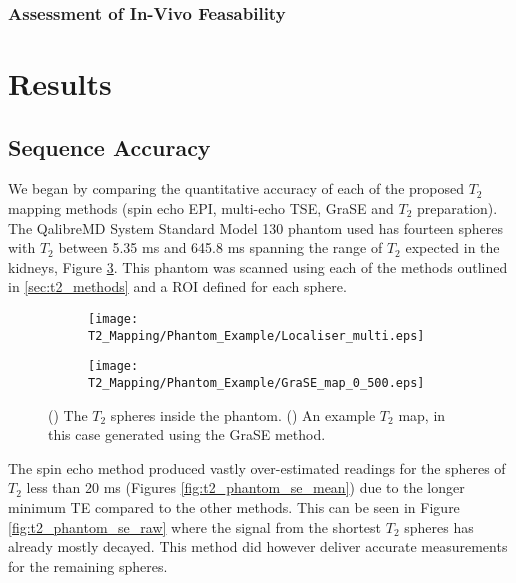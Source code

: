 \subsubsection{Assessment of In-Vivo Feasability}

\section{Results}

\subsection{Sequence Accuracy}

We began by comparing the quantitative accuracy of each of the proposed $T_2$ mapping methods (spin echo \ac{EPI}, multi-echo \ac{TSE}, \ac{GraSE} and $T_2$ preparation).  The QalibreMD System Standard Model 130 phantom used has fourteen spheres with $T_2$ between 5.35 ms and 645.8 ms spanning the range of $T_2$ expected in the kidneys, Figure \ref{fig:t2_phantom_eg}. This phantom was scanned using each of the methods outlined in \ref{sec:t2_methods} and a \ac{ROI} defined for each sphere. 

\begin{figure}[H]
	\centering
	\begin{subfigure}[c]{0.47\textwidth}
		\centering
		\texttt{[image: T2\_Mapping/Phantom\_Example/Localiser\_multi.eps]}
		\caption{}
		\label{fig:t2_phantom_loc}
	\end{subfigure}
	\hfill
	\begin{subfigure}[c]{0.47\textwidth}
		\centering
		\texttt{[image: T2\_Mapping/Phantom\_Example/GraSE\_map\_0\_500.eps]}
		\caption{}
		\label{fig:t2_phantom_map}
	\end{subfigure}
	\caption{() The $T_2$ spheres inside the phantom. () An example $T_2$ map, in this case generated using the \ac{GraSE} method.}
	\label{fig:t2_phantom_eg}
\end{figure}

The spin echo method produced vastly over-estimated readings for the spheres of $T_2$ less than 20 ms (Figures \ref{fig:t2_phantom_se_mean}) due to the longer minimum \ac{TE} compared to the other methods. This can be seen in Figure \ref{fig:t2_phantom_se_raw} where the signal from the shortest $T_2$ spheres has already mostly decayed. This method did however deliver accurate measurements for the remaining spheres.

